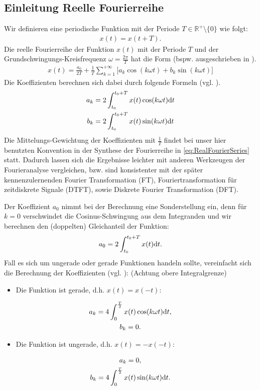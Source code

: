 \documentclass[11pt,a4paper,DIV=12]{scrartcl}
\begin{document}
\subsection{Einleitung Reelle Fourierreihe}
%
Wir definieren eine periodische Funktion mit der Periode
%
$T\in\mathbb{R}^+\setminus\{0\}$
%
wie folgt:
%
\begin{align}
	x(t)=x(t+T).
\end{align}
%
Die reelle Fourierreihe der Funktion $x(t)$ mit der Periode $T$ und der
Grundschwingungs-Kreisfrequenz $\omega=\frac{2\pi}{T}$ hat die Form (bspw. ausgeschrieben in
\cite[Kap. 7, S. 474]{Bronstein2015}).
%
\begin{align}
	\label{eq:RealFourierSeries}
	x(t)=\frac{a_0}{2T}+\frac{1}{T}\sum_{k=1}^{+\infty}\big[ a_k\cos(k\omega t)+b_k\sin(k\omega t)\big]
\end{align}
%
Die Koeffizienten berechnen sich dabei durch folgende Formeln
(vgl. \cite[Kap. 7, S. 474]{Bronstein2015}).
%
\begin{gather}
	\label{eq:Koeff}
	a_k=2\int_{t_0}^{t_0+T}x(t)\cos(k\omega t)\mathrm{d} t \\
	b_k=2\int_{t_0}^{t_0+T}x(t)\sin(k\omega t)\mathrm{d} t
\end{gather}
%
Die Mittelungs-Gewichtung der Koeffizienten mit $\frac{1}{T}$ findet bei
unser hier benutzten Konvention in der
Synthese der Fourierreihe in \eqref{eq:RealFourierSeries} statt.
%
Dadurch lassen sich die Ergebnisse leichter mit anderen Werkzeugen
der Fourieranalyse vergleichen, bzw. sind konsistenter mit der
später kennenzulernenden Fourier Transformation (FT), Fouriertransformation für
zeitdiskrete Signale (DTFT), sowie Diskrete Fourier Transformation (DFT).
%

Der Koeffizient $a_0$ nimmt bei der Berechnung eine Sonderstellung ein, denn für
$k=0$ verschwindet die Cosinus-Schwingung aus dem Integranden und wir berechnen
den (doppelten) Gleichanteil der Funktion:
%
\begin{align}
	\label{eq:A0}
	a_0=2\int_{t_0}^{t_0+T}x(t)\mathrm{d} t.
\end{align}
%
Fall es sich um ungerade oder gerade Funktionen handeln sollte, vereinfacht sich
die Berechnung der Koeffizienten (vgl. \cite[Kap.7, S. 476]{Bronstein2015}): (Achtung obere Integralgrenze)
%
\begin{itemize}
	\item Die Funktion ist gerade, d.h. $x(t)=x(-t)$:
\end{itemize}
%
\begin{gather}
	\label{eq:KoeffGerade}
	a_k=4\int_0^{\frac{T}{2}}x(t)\cos(k \omega t)\mathrm{d} t,\\
	b_k=0.
\end{gather}
%
\begin{itemize}
	\item Die Funktion ist ungerade, d.h. $x(t)=-x(-t)$:
\end{itemize}
%
\begin{gather}
	\label{eq:KoeffUngerade}
	a_k = 0,\\
	b_k=4\int_0^{\frac{T}{2}}x(t)\sin(k \omega t)\mathrm{d} t.
\end{gather}
%
\end{document}

